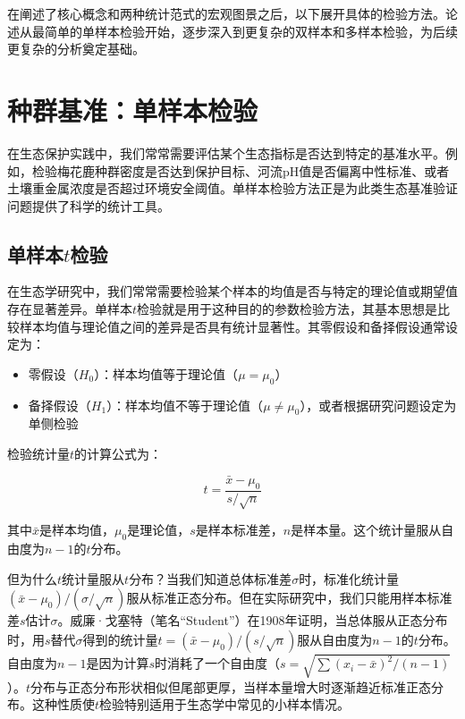 \documentclass[
  twoside,12pt,fontset=none]{ctexbook}
\providecommand{\tightlist}{%
  \setlength{\itemsep}{0pt}\setlength{\parskip}{0pt}}
\begin{document}
在阐述了核心概念和两种统计范式的宏观图景之后，以下展开具体的检验方法。论述从最简单的单样本检验开始，逐步深入到更复杂的双样本和多样本检验，为后续更复杂的分析奠定基础。

\hypertarget{ux79cdux7fa4ux57faux51c6ux5355ux6837ux672cux68c0ux9a8c}{%
\section{种群基准：单样本检验}\label{ux79cdux7fa4ux57faux51c6ux5355ux6837ux672cux68c0ux9a8c}}

在生态保护实践中，我们常常需要评估某个生态指标是否达到特定的基准水平。例如，检验梅花鹿种群密度是否达到保护目标、河流pH值是否偏离中性标准、或者土壤重金属浓度是否超过环境安全阈值。单样本检验方法正是为此类生态基准验证问题提供了科学的统计工具。

\hypertarget{ux5355ux6837ux672ctux68c0ux9a8c}{%
\subsection{\texorpdfstring{单样本\(t\)检验}{单样本t检验}}\label{ux5355ux6837ux672ctux68c0ux9a8c}}

在生态学研究中，我们常常需要检验某个样本的均值是否与特定的理论值或期望值存在显著差异。单样本\(t\)检验就是用于这种目的的参数检验方法，其基本思想是比较样本均值与理论值之间的差异是否具有统计显著性。其零假设和备择假设通常设定为：

\begin{itemize}
\tightlist
\item
  零假设（\(H_0\)）：样本均值等于理论值（\(\mu = \mu_0\)）
\item
  备择假设（\(H_1\)）：样本均值不等于理论值（\(\mu \neq \mu_0\)），或者根据研究问题设定为单侧检验
\end{itemize}

检验统计量\(t\)的计算公式为：

\[t = \frac{\bar{x} - \mu_0}{s/\sqrt{n}}\]

其中\(\bar{x}\)是样本均值，\(\mu_0\)是理论值，\(s\)是样本标准差，\(n\)是样本量。这个统计量服从自由度为\(n-1\)的\(t\)分布。

但为什么\(t\)统计量服从\(t\)分布？当我们知道总体标准差\(\sigma\)时，标准化统计量\((\bar{x}-\mu_0)/(\sigma/\sqrt{n})\)服从标准正态分布。但在实际研究中，我们只能用样本标准差\(s\)估计\(\sigma\)。威廉·戈塞特（笔名``Student''）在1908年证明，当总体服从正态分布时，用\(s\)替代\(\sigma\)得到的统计量\(t = (\bar{x}-\mu_0)/(s/\sqrt{n})\)服从自由度为\(n-1\)的\(t\)分布。自由度为\(n-1\)是因为计算\(s\)时消耗了一个自由度（\(s = \sqrt{\sum(x_i-\bar{x})^2/(n-1)}\)）。\(t\)分布与正态分布形状相似但尾部更厚，当样本量增大时逐渐趋近标准正态分布。这种性质使\(t\)检验特别适用于生态学中常见的小样本情况。
\end{document}
